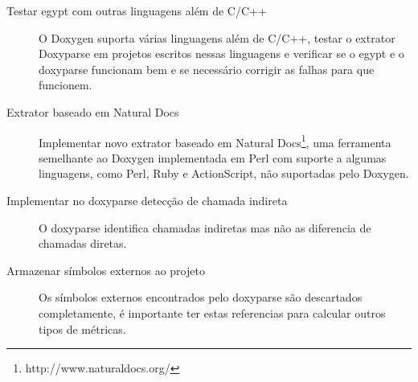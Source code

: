 \begin{description}

\item[Testar egypt com outras linguagens além de C/C++] O Doxygen suporta várias linguagens além de C/C++, testar o extrator Doxyparse em projetos escritos nessas linguagens e verificar se o egypt e o doxyparse funcionam bem e se necessário corrigir as falhas para que funcionem.

\item[Extrator baseado em Natural Docs] Implementar novo extrator baseado em Natural Docs\footnote{http://www.naturaldocs.org/}, uma ferramenta semelhante ao Doxygen implementada em Perl com suporte a algumas linguagens, como Perl, Ruby e ActionScript, não suportadas pelo Doxygen.

\item[Implementar no doxyparse detecção de chamada indireta] O doxyparse identifica chamadas indiretas mas não as diferencia de chamadas diretas.

\item[Armazenar símbolos externos ao projeto] Os símbolos externos encontrados pelo doxyparse são descartados completamente, é importante ter estas referencias para calcular outros tipos de métricas.

\end{description}
